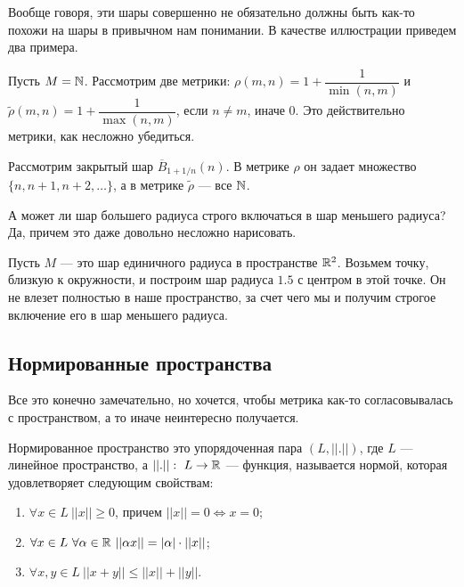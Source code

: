 Вообще говоря, эти шары совершенно не обязательно должны быть как-то похожи на шары в привычном нам понимании. В качестве иллюстрации приведем два примера.
\begin{Examples}
Пусть $M = \mathbb{N}$. Рассмотрим две метрики: $\rho(m, n) = 1 + \dfrac{1}{\min(n, m)}$ и $\widetilde{\rho}(m, n) = 1 + \dfrac{1}{\max(n, m)}$, если $n \neq m$, иначе 0. Это действительно метрики, как несложно убедиться.

Рассмотрим закрытый шар $\overline{B}_{1 + 1/n}(n)$. В метрике $\rho$ он задает множество $\{n, n+1, n+2, \ldots\}$, а в метрике $\widetilde{\rho}$ --- все $\mathbb{N}$. 
\end{Examples}

\begin{Examples}
А может ли шар большего радиуса строго включаться в шар меньшего радиуса? Да, причем это даже довольно несложно нарисовать.

Пусть $M$ --- это шар единичного радиуса в пространстве $\mathbb{R}^2$. Возьмем точку, близкую к окружности, и построим шар радиуса $1.5$ с центром в этой точке. Он не влезет полностью в наше пространство, за счет чего мы и получим строгое включение его в шар меньшего радиуса.


\end{Examples}

\subsection{Нормированные пространства}
Все это конечно замечательно, но хочется, чтобы метрика как-то согласовывалась с пространством, а то иначе неинтересно получается.

\begin{Def}
Нормированное пространство это упорядоченная пара $(L, ||.||)$, где $L$ --- линейное пространство, а $||.||:\ L \to \mathbb{R}$ --- функция, называется нормой, которая удовлетворяет следующим свойствам:
\begin{enumerate}
\item $\forall x \in L\ ||x|| \geq 0$, причем $||x|| = 0 \Leftrightarrow x = 0$;
\item $\forall x \in L\ \forall \alpha \in \mathbb{R}\ ||\alpha x|| = |\alpha|\cdot ||x||$;
\item $\forall x, y \in L\ ||x + y|| \leq ||x|| + ||y||$.
\end{enumerate}
\end{Def}

